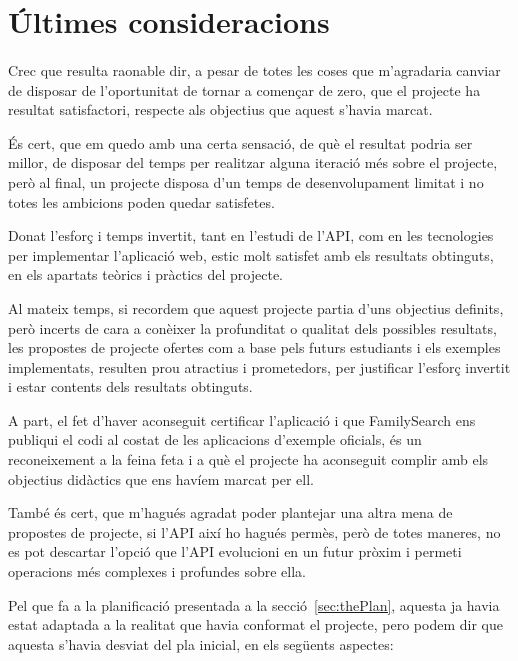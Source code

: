 \section{Últimes consideracions}

    \paragraph{}
    Crec que resulta raonable dir, a pesar de totes les coses que m'agradaria canviar de disposar de l'oportunitat de tornar a començar de zero, que el projecte ha resultat satisfactori, respecte als objectius que aquest s'havia marcat.

    És cert, que em quedo amb una certa sensació, de què el resultat podria ser millor, de disposar del temps per realitzar alguna iteració més sobre el projecte, però al final, un projecte disposa d’un temps de desenvolupament limitat i no totes les ambicions poden quedar satisfetes.

    Donat l’esforç i temps invertit, tant en l’estudi de l’API, com en les tecnologies per implementar l’aplicació web, estic molt satisfet amb els resultats obtinguts, en els apartats teòrics i pràctics del projecte.

    Al mateix temps, si recordem que aquest projecte partia d’uns objectius definits, però incerts de cara a conèixer la profunditat o qualitat dels possibles resultats, les propostes de projecte ofertes com a base pels futurs estudiants i els exemples implementats, resulten prou atractius i prometedors, per justificar l’esforç invertit i estar contents dels resultats obtinguts.

    A part, el fet d'haver aconseguit certificar l'aplicació i que FamilySearch ens publiqui el codi al costat de les aplicacions d'exemple oficials, és un reconeixement a la feina feta i a què el projecte ha aconseguit complir amb els objectius didàctics que ens havíem marcat per ell.

    També és cert, que m’hagués agradat poder plantejar una altra mena de propostes de projecte, si l’API així ho hagués permès, però de totes maneres, no es pot descartar l’opció que l’API evolucioni en un futur pròxim i permeti operacions més complexes  i profundes sobre ella.

    Pel que fa a la planificació presentada a la secció~\ref{sec:thePlan}, aquesta ja havia estat adaptada a la realitat que havia conformat el projecte, pero podem dir que aquesta s'havia desviat del pla inicial, en els següents aspectes:

